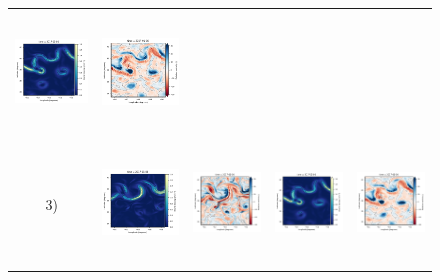 \begin{figure}[h!]
\begin{center}
\begin{tabular}{ccccc}
 \includegraphics[trim={13mm 13mm 22mm 5mm},clip, width=3.2cm,height=3.2cm]{figures/plots/glorys12-f_rec_ke.png} &
 \includegraphics[trim={13mm 13mm 22mm 5mm},clip,width=3.2cm,height=3.2cm]{figures/plots/glorys12-f_rec_vort_r.png} \\
\hspace{-10mm} 3) &
 \includegraphics[trim={0 13mm 22mm 5mm},clip, width=3.60cm,height=3.2cm]{figures/plots/glorys12-r_train_ke.png} &
 \includegraphics[trim={13mm 13mm 22mm 5mm},clip, width=3.2cm,height=3.2cm]{figures/plots/glorys12-r_train_vort_r.png} &
 \includegraphics[trim={13mm 13mm 22mm 5mm},clip, width=3.2cm,height=3.2cm]{figures/plots/glorys12-r_rec_ke.png} &
 \includegraphics[trim={13mm 13mm 22mm 5mm},clip,width=3.2cm,height=3.2cm]{figures/plots/glorys12-r_rec_vort_r.png} \\

\end{tabular}
\end{center}
\end{figure}
